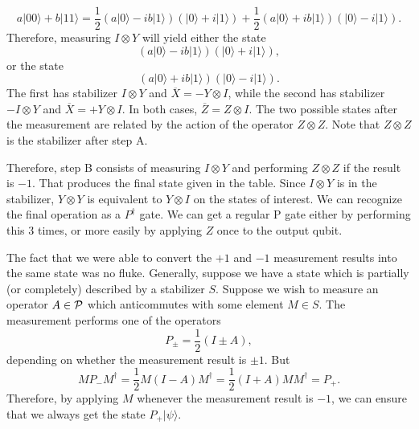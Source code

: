 \begin{equation}
a|00\rangle + b|11\rangle = \frac{1}{2} \left( a|0\rangle -
ib|1\rangle \right) \left( |0\rangle + i |1\rangle \right) +
\frac{1}{2} \left( a|0\rangle + ib|1\rangle \right) \left( |0\rangle -
i |1\rangle \right).
\end{equation}
Therefore, measuring $I \otimes Y$ will yield either the state
\begin{equation}
\left( a|0\rangle - ib|1\rangle \right) \left( |0\rangle + i |1\rangle
\right),
\end{equation}
or the state
\begin{equation}
\left( a|0\rangle + ib|1\rangle \right) \left( |0\rangle - i |1\rangle
\right).
\end{equation}
The first has stabilizer $I \otimes Y$ and $\overline{X} = - Y \otimes
I$, while the second has stabilizer $- I \otimes Y$ and $\overline{X} =
+ Y \otimes I$.  In both cases, $\overline{Z} = Z \otimes I$.  The two
possible states after the measurement are related by the action of the
operator $Z \otimes Z$.  Note that $Z \otimes Z$ is the stabilizer
after step A.

Therefore, step B consists of measuring $I \otimes Y$ and performing
$Z \otimes Z$ if the result is $-1$.  That produces the final state
given in the table.  Since $I \otimes Y$ is in the stabilizer, $Y
\otimes Y$ is equivalent to $Y \otimes I$ on the states of interest.
We can recognize the final operation as a $P^\dagger$ gate.  We can get 
a regular P gate either by performing this 3 times, or more easily by
applying $Z$ once to the output qubit.

The fact that we were able to convert the $+1$ and $-1$ measurement
results into the same state was no fluke.  Generally, suppose we have
a state which is partially (or completely) described by a stabilizer $S$.
Suppose we wish to measure an operator $A \in {\cal P}$ which
anticommutes with some element $M \in S$.  The measurement performs
one of the operators
\begin{equation}
P_{\pm} = \frac{1}{2} (I \pm A),
\end{equation}
depending on whether the measurement result is $\pm 1$.  But
\begin{equation}
M P_- M^\dagger = \frac{1}{2} M (I - A) M^\dagger = \frac{1}{2} (I +
A) M M^\dagger = P_+.
\end{equation}
Therefore, by applying $M$ whenever the measurement result is $-1$, we
can ensure that we always get the state $P_+ |\psi\rangle$.

